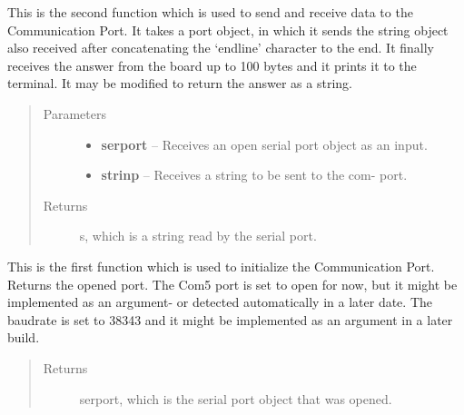 \documentclass[letterpaper,10pt,english]{sphinxmanual}
\begin{document}

\begin{fulllineitems}
\label{Code:leonSer.leonsend}
This is the second function which is used to send and receive data to the Communication Port.
It takes a port object, in which it sends the string object also received after concatenating 
the `endline' character to the end.     
It finally receives the answer from the board  up to 100 bytes and it prints it to the terminal.
It may be modified to return the answer as a string.
\begin{quote}\begin{description}
\item[{Parameters}] \leavevmode\begin{itemize}
\item {} 
\textbf{serport} -- Receives an open serial port object as an input.

\item {} 
\textbf{strinp} -- Receives a string to be sent to the com- port.

\end{itemize}

\item[{Returns}] \leavevmode
s, which is a string read by the serial port.

\end{description}\end{quote}

\end{fulllineitems}


\begin{fulllineitems}
\label{Code:leonSer.leonstart}
This is the first function which is used to initialize the Communication Port. 
Returns the opened port. The Com5 port is set to open for now, but it might be 
implemented as an argument- or detected automatically in a later date.
The baudrate is set to 38343 and it might be implemented as an argument in a later build.
\begin{quote}\begin{description}
\item[{Returns}] \leavevmode
serport, which is the serial port object that was opened.

\end{description}\end{quote}

\end{fulllineitems}
\end{document}
